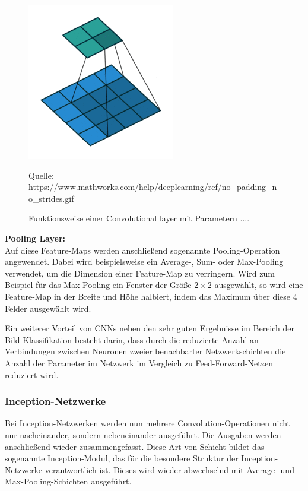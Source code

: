 \documentclass[11pt,a4paper]{article}
\newcommand{\source}[1]{\caption*{\hfill Quelle: {#1}} }
\numberwithin{equation}{section}
\begin{document}
\begin{figure}[ht]
		\includegraphics[width=0.1\textheight]{frame_3_delay-1s.png}
		\caption[Funktionsweise einer Convolutional Layer]{Funktionsweise einer Convolutional layer mit Parametern ....}
		
		\label{im:convolution}
		\source{https://www.mathworks.com/help/deeplearning/ref/no\_padding\_no\_strides.gif}
	\end{figure}
	

	\noindent\textbf{Pooling Layer:}\\
	Auf diese Feature-Maps werden anschließend sogenannte Pooling-Operation angewendet. Dabei wird beispielsweise ein Average-, Sum- oder Max-Pooling verwendet, um die Dimension einer Feature-Map zu verringern. Wird zum Beispiel für das Max-Pooling ein Fenster der Größe $2 \times 2$ ausgewählt, so wird eine Feature-Map in der Breite und Höhe halbiert, indem das Maximum über diese 4 Felder ausgewählt wird.
		
	Ein weiterer Vorteil von CNNs neben den sehr guten Ergebnisse im Bereich der Bild-Klassifikation besteht darin, dass durch die reduzierte Anzahl an Verbindungen zwischen Neuronen zweier benachbarter Netzwerkschichten die Anzahl der Parameter im Netzwerk im Vergleich zu Feed-Forward-Netzen reduziert wird.
	
	\subsubsection{Inception-Netzwerke}\label{chapter:inception}
	Bei Inception-Netzwerken werden nun mehrere Convolution-Operationen nicht nur nacheinander, sondern nebeneinander ausgeführt. Die Ausgaben werden anschließend wieder zusammengefasst. Diese Art von Schicht bildet das sogenannte Inception-Modul, das für die besondere Struktur der Inception-Netzwerke verantwortlich ist. Dieses wird wieder abwechselnd mit Average- und Max-Pooling-Schichten ausgeführt.
	
\end{document}
